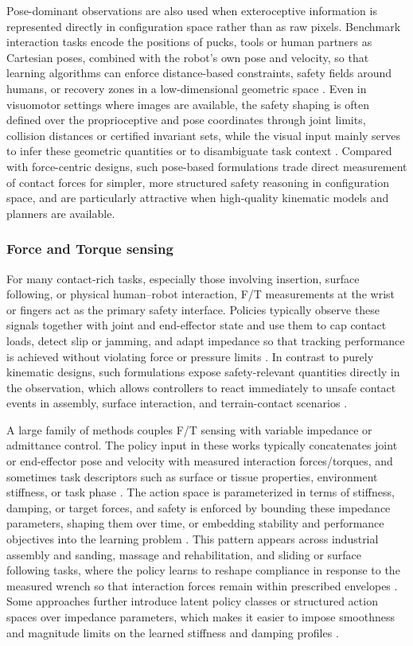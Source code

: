 \documentclass[Afour,sageh,times]{template/sagej}
\begin{document}
Pose-dominant observations are also used when exteroceptive information is represented directly in configuration space rather than as raw pixels. Benchmark interaction tasks encode the positions of pucks, tools or human partners as Cartesian poses, combined with the robot’s own pose and velocity, so that learning algorithms can enforce distance-based constraints, safety fields around humans, or recovery zones in a low-dimensional geometric space \citep{91,48,zhang2025bresa}. Even in visuomotor settings where images are available, the safety shaping is often defined over the proprioceptive and pose coordinates through joint limits, collision distances or certified invariant sets, while the visual input mainly serves to infer these geometric quantities or to disambiguate task context \citep{13,47,95,99,107}. Compared with force-centric designs, such pose-based formulations trade direct measurement of contact forces for simpler, more structured safety reasoning in configuration space, and are particularly attractive when high-quality kinematic models and planners are available.

\subsubsection{Force and Torque sensing}

For many contact-rich tasks, especially those involving insertion, surface following, or physical human–robot interaction, F/T measurements at the wrist or fingers act as the primary safety interface. Policies typically observe these signals together with joint and end-effector state and use them to cap contact loads, detect slip or jamming, and adapt impedance so that tracking performance is achieved without violating force or pressure limits \citep{1,2,4,23}. In contrast to purely kinematic designs, such formulations expose safety-relevant quantities directly in the observation, which allows controllers to react immediately to unsafe contact events in assembly, surface interaction, and terrain-contact scenarios \citep{19,32,39,61}.

A large family of methods couples F/T sensing with variable impedance or admittance control. The policy input in these works typically concatenates joint or end-effector pose and velocity with measured interaction forces/torques, and sometimes task descriptors such as surface or tissue properties, environment stiffness, or task phase \citep{2,19,32,46}. The action space is parameterized in terms of stiffness, damping, or target forces, and safety is enforced by bounding these impedance parameters, shaping them over time, or embedding stability and performance objectives into the learning problem \citep{23,25,41,78}. This pattern appears across industrial assembly and sanding, massage and rehabilitation, and sliding or surface following tasks, where the policy learns to reshape compliance in response to the measured wrench so that interaction forces remain within prescribed envelopes \citep{39,61,69,71}. Some approaches further introduce latent policy classes or structured action spaces over impedance parameters, which makes it easier to impose smoothness and magnitude limits on the learned stiffness and damping profiles \citep{1,40,59,74}.
\end{document}
